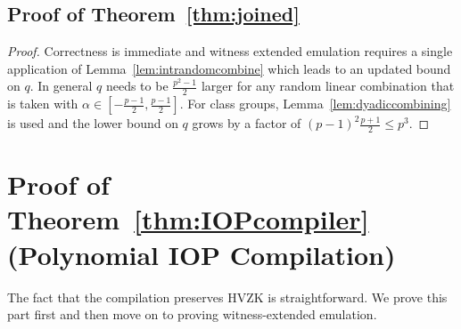%


\subsection{Proof of Theorem~\ref{thm:joined}} \label{appendix:joined}

\def\thetheorem{\ref{thm:joined}}
\begin{theorem}
\theoremjoined
\end{theorem}

\begin{proof}
    Correctness is immediate and witness extended emulation requires a single application of Lemma~\ref{lem:intrandomcombine} which leads to an updated bound on $q$. In general $q$ needs to be $\frac{p^2-1}{2}$ larger for any random linear combination that is taken with $\alpha \in [-\frac{p-1}{2},\frac{p-1}{2}]$. For class groups, Lemma~\ref{lem:dyadiccombining} is used and the lower bound on $q$ grows by a factor of $(p-1)^2\frac{p+1}{2}\leq p^3$.
\end{proof}



\section{Proof of Theorem~\ref{thm:IOPcompiler} (Polynomial IOP Compilation)}\label{sec:IOPcompilerproof}


\def\thetheorem{\ref{thm:IOPcompiler}}
\begin{theorem}
\theoremIOPcompiler
\end{theorem}

The fact that the compilation preserves HVZK is straightforward. We prove this part first and then move on to proving witness-extended emulation. 


